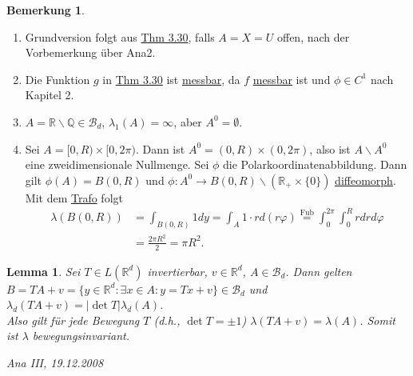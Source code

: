 \documentclass[a4paper]{scrreprt}
\newcommand{\R}{\mathbb{R}}
\newcommand{\Q}{\mathbb{Q}}
\newcommand{\Borel}{\mathcal{B}}
\newcommand{\Bd}{\Borel_d}
\newcommand{\jlabel}[1]{\label{j_#1}}
\newcommand{\jhyperref}[2]{\hyperref[j_#1]{#2}}
\newcommand{\jlink}[1]{\jhyperref{#1}{#1}}
\newcommand{\jabb}[3]{ #1: #2 \rightarrow #3 }
\newcommand{\jshortlinkFubini}{\jhyperref{Fubini}{\text{Fub}}}
\newcommand{\jspacesmall}{\vspace{4pt}}
\newcommand{\jdate}[1]{\jspacesmall\begin{center}\jlabel{#1}\tiny{Ana III, #1}\end{center}}
\theoremstyle{plain}
\newtheorem{lem}[thm]{Lemma}
\theoremstyle{definition}
\newtheorem*{bem*}{Bemerkung}
\begin{document}
{{{{\begin{bem*}
    \begin{enumerate}
        \item Grundversion folgt aus \jlink{Thm 3.30}, falls $A=X=U$ offen, nach der Vorbemerkung über Ana2.
        \item Die Funktion $g$ in \jlink{Thm 3.30} ist \jlink{messbar}, da $f$ \jlink{messbar} ist und $\phi \in C^1$ nach Kapitel 2.
        \item $A = \R\backslash \Q\in \Bd$, $\lambda_1(A)=\infty$, aber $A^0 = \emptyset$.
        \item Sei $A=[0,R)\times [0,2\pi)$. Dann ist $A^0 = (0,R)\times (0,2\pi)$, also ist $A\backslash A^0$ eine zweidimensionale Nullmenge. Sei $\phi$ die Polarkoordinatenabbildung. Dann gilt $\phi(A) = B(0,R)$ und $\jabb{\phi}{A^0}{B(0,R)\backslash (\R_+ \times \{0\})}$ \jlink{diffeomorph}. Mit dem \jlink{Trafo} folgt
        \begin{displaymath}
            \begin{split}
                \lambda(B(0,R)) &= \int_{B(0,R)} 1 dy = \int_A 1 \cdot r d(r\varphi) \overset{\jshortlinkFubini}{=} \int_0^{2\pi}\int_0^R r dr d\varphi \\
                &= \frac{2\pi R^2}{2} = \pi R^2.
            \end{split}
        \end{displaymath}
    \end{enumerate}
\end{bem*}

\begin{lem}
    \jlabel{Lem 3.31}
    Sei $T\in L(\R^d)$ invertierbar, $v \in \R^d$, $A\in \Bd$. Dann gelten $B=TA + v = \{y\in \R^d : \exists x \in A : y = Tx + v\} \in \Bd$ und $\lambda_d(TA+v) = |\det T| \lambda_d(A)$.\\
    Also gilt für jede Bewegung $T$ (d.h., $\det T = \pm 1$) $\lambda(TA + v) = \lambda(A)$. Somit ist $\lambda$ bewegungsinvariant.
    
\jdate{19.12.2008}


\end{lem}}}}}
\end{document}
